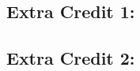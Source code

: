 \documentclass[main.tex]{subfiles}
\begin{document}
\subsection{Extra Credit 1:}

\subsection{Extra Credit 2:}
\end{document}
